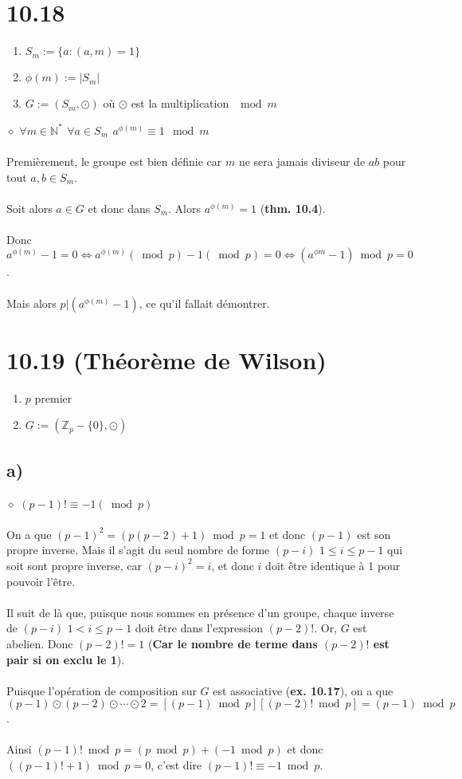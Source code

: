 \documentclass[a4paper,10pt]{article}
\begin{document}
\section*{10.18}
\begin{enumerate}
 \item $S_m := \{a : (a,m) = 1\}$
 \item $\phi(m) := |S_m|$
 \item $G := (S_m, \odot)$ où $\odot$ est la multiplication $\mod{m}$
\end{enumerate}
$\diamond$ \textbf{$\forall m \in \mathbb{N}^*$ $\forall a \in S_m$ $a^{\phi(m)} \equiv 1 \mod{m}$}
\\
\\
Premièrement, le groupe est bien définie car $m$ ne sera jamais diviseur de $ab$ pour tout $a,b \in S_m$. 
\\
\\
Soit alors $a \in G$ et donc dans $S_m$. Alors $a^{\phi(m)} = 1$ (\textbf{thm. 10.4}).
\\
\\
Donc $a^{\phi(m)} - 1 = 0 \Leftrightarrow a^{\phi(m)} (\bmod p) - 1 (\bmod p) = 0 \Leftrightarrow (a^{\phi{m}} - 1) \bmod p = 0$.
\\
\\
Mais alors $p | (a^{\phi(m)} - 1)$, ce qu'il fallait démontrer.

\section*{10.19 (Théorème de Wilson)}
\begin{enumerate}
 \item $p$ premier
 \item $G := (\mathbb{Z}_p - \{0\}, \odot)$
\end{enumerate}
\subsection*{a)}
$\diamond$ \textbf{$(p-1)! \equiv -1 (\bmod p)$}
\\
\\
On a que $(p-1)^2 = (p(p-2) + 1)\bmod p = 1$ et donc $(p-1)$ est son propre inverse. Mais il s'agit du seul nombre de forme
$(p-i)$ $1 \leq i \leq p-1$ qui soit sont propre inverse, car $(p-i)^2 = i$, et donc $i$ doit être identique à 1 pour pouvoir l'être.
\\
\\
Il suit de là que, puisque nous sommes en présence d'un groupe, chaque inverse de $(p-i)$ $ 1 < i \leq p-1$ doit être dans l'expression
$(p-2)!$. Or, $G$ est abelien. Donc $(p-2)! = 1$ (\textbf{Car le nombre de terme dans $(p-2)!$ est pair si on exclu le 1}). 
\\
\\
Puisque l'opération de composition sur $G$ est associative (\textbf{ex. 10.17}), on a que $(p-1) \odot (p-2) \odot \cdots \odot 2 = [(p-1)\bmod p][(p-2)! \bmod p] = (p-1) \bmod p$. 
\\
\\
Ainsi $(p-1)! \bmod p = (p \bmod p) + (-1 \bmod p) $ et donc $((p-1)! + 1) \bmod p = 0$, c'est dire $(p-1)! \equiv -1 \bmod p$.
\end{document}

